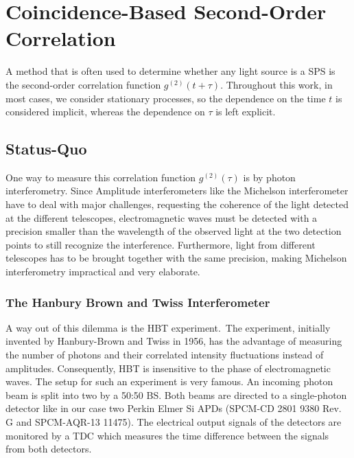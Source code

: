 \chapter{Coincidence-Based Second-Order Correlation}%
\chaptertoc

A method that is often used to determine whether any light source is a \ac{SPS} is the second-order correlation function $g^{(2)}(t+\tau)$. Throughout this work, in most cases, we consider stationary processes, so the dependence on the time $t$ is considered implicit, whereas the dependence on $\tau$ is left explicit. 

\section{Status-Quo}
One way to measure this correlation function $g^{(2)}(\tau)$ is by photon interferometry. Since Amplitude interferometers like the Michelson interferometer have to deal with major challenges, requesting the coherence of the light detected at the different telescopes, electromagnetic waves must be detected with a precision smaller than the wavelength of the observed light at the two detection points to still recognize the interference. Furthermore, light from different telescopes has to be brought together with the same precision, making Michelson interferometry impractical and very elaborate.

\subsection{The Hanbury Brown and Twiss Interferometer}
A way out of this dilemma is the \ac{HBT} experiment.~The experiment, initially invented by Hanbury-Brown and Twiss in 1956, has the advantage of measuring the number of photons and their correlated intensity fluctuations instead of amplitudes. Consequently, \ac{HBT} is insensitive to the phase of electromagnetic waves.
The setup for such an experiment is very famous. An incoming photon beam is split into two by a 50:50 \ac{BS}. Both beams are directed to a single-photon detector like in our case two Perkin Elmer Si \ac{APD}s (\ac{SPCM}-CD 2801 9380 Rev. G and \ac{SPCM}-AQR-13 11475). The electrical output signals of the detectors are monitored by a \ac{TDC} which measures the time difference between the signals from both detectors.


